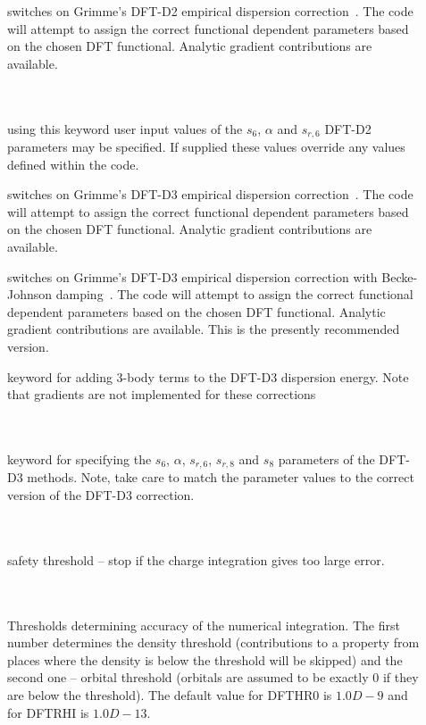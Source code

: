 \begin{description}
\item[]
  switches on Grimme's DFT-D2 empirical dispersion correction~\cite{dft:dftd2}.
  The code will attempt to assign the correct functional dependent 
  parameters based on the chosen DFT functional. Analytic gradient contributions are available.
 
\item[] \ \\
   \\
  using this keyword user input values of the $s_6$, $\alpha$ and $s_{r,6}$ DFT-D2 parameters may be specified. If supplied these values override
  any values defined within the code.

\item[]
  switches on Grimme's DFT-D3 empirical dispersion correction~\cite{dft:dftd3}. The code will attempt to assign the correct functional dependent 
  parameters based on the chosen DFT functional. Analytic gradient contributions are available.
  
\item[]
  switches on Grimme's DFT-D3 empirical dispersion correction with Becke-Johnson damping~\cite{dft:dftd3bj}. 
  The code will attempt to assign the correct functional dependent parameters based on the chosen DFT functional. 
  Analytic gradient contributions are available. This is the presently recommended version.
  
\item[]
  keyword for adding 3-body terms to the DFT-D3 dispersion energy. Note that gradients are not implemented for these corrections 

\item[] \ \\
   \\
  keyword for specifying the $s_6$, $\alpha$, $s_{r,6}$, $s_{r,8}$ and $s_8$ parameters of the DFT-D3 methods. Note, take care to 
  match the parameter values to the correct version of the DFT-D3 correction.

\item[] \ \\
   \\
  safety threshold -- stop if the charge integration gives too large
  error.

\item[] \ \\
   \\
  Thresholds determining accuracy of the numerical integration. The
  first number determines the density threshold (contributions to a
  property from places where the density is below the threshold will
  be skipped) and the second one -- orbital threshold (orbitals are
  assumed to be exactly 0 if they are below the threshold). The
  default value for DFTHR0 is $1.0D-9$ and for DFTRHI is $1.0D-13$.


\end{description}
